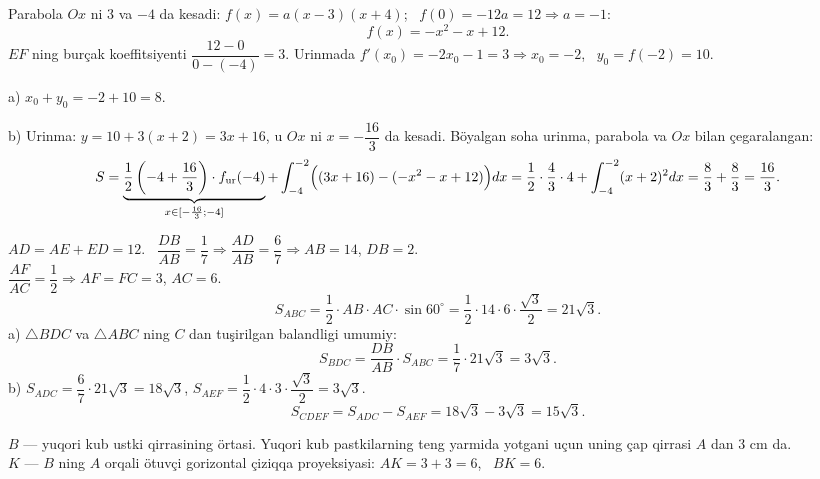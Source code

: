 \newpage
{}
Parabola $Ox$ ni $3$ va $-4$ da kesadi: $f(x)=a(x-3)(x+4)$; \ $f(0)=-12a=12\Rightarrow a=-1$:
\[f(x)=-x^2-x+12.\]
$EF$ ning burçak koeffitsiyenti $\dfrac{12-0}{0-(-4)}=3$. Urinmada $f'(x_0)=-2x_0-1=3\Rightarrow x_0=-2$, \ $y_0=f(-2)=10$.

a) $x_0+y_0=-2+10=8$.

b) Urinma: $y=10+3(x+2)=3x+16$, u $Ox$ ni $x=-\dfrac{16}3$ da kesadi. Böyalgan soha urinma, parabola va $Ox$ bilan çegaralangan:
\[S=\underbrace{\frac12\left(-4+\frac{16}3\right)\cdot f_{\text{ur}}(-4)}_{x\in[-\frac{16}3;-4]}+\int_{-4}^{-2}\Bigl((3x+16)-(-x^2-x+12)\Bigr)dx=\frac12\cdot\frac43\cdot4+\int_{-4}^{-2}(x+2)^2dx=\frac83+\frac83=\frac{16}3.\]

\newpage
{}
$AD=AE+ED=12$. \ $\dfrac{DB}{AB}=\dfrac17\Rightarrow \dfrac{AD}{AB}=\dfrac67\Rightarrow AB=14$, $DB=2$.\\
$\dfrac{AF}{AC}=\dfrac12\Rightarrow AF=FC=3$, $AC=6$.
\[S_{ABC}=\frac12\cdot AB\cdot AC\cdot\sin60^\circ=\frac12\cdot14\cdot6\cdot\frac{\sqrt3}2=21\sqrt3.\]
a) $\triangle BDC$ va $\triangle ABC$ ning $C$ dan tuşirilgan balandligi umumiy:
\[S_{BDC}=\frac{DB}{AB}\cdot S_{ABC}=\frac17\cdot21\sqrt3=3\sqrt3.\]
b) $S_{ADC}=\dfrac67\cdot21\sqrt3=18\sqrt3$, \quad $S_{AEF}=\dfrac12\cdot4\cdot3\cdot\dfrac{\sqrt3}2=3\sqrt3$.
\[S_{CDEF}=S_{ADC}-S_{AEF}=18\sqrt3-3\sqrt3=15\sqrt3.\]

\newpage
{}
$B$ — yuqori kub ustki qirrasining örtasi. Yuqori kub pastkilarning teng yarmida yotgani uçun uning çap qirrasi $A$ dan $3$ cm da.\\
$K$ — $B$ ning $A$ orqali ötuvçi gorizontal çiziqqa proyeksiyasi: $AK=3+3=6$, \ $BK=6$.

